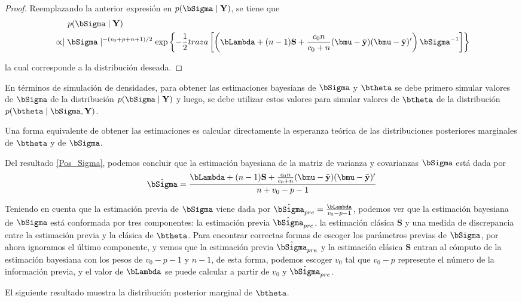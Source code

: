 \begin{proof}
Reemplazando la anterior expresión en $p(\bSigma\mid\mathbf{Y})$, se tiene que
\begin{align*}
&\ \ \ \ \ p(\bSigma\mid\mathbf{Y})\\
&\propto \mid\bSigma\mid^{-(v_0+p+n+1)/2}\exp\left\{-\frac{1}{2}traza\left[\left(\bLambda+(n-1)\mathbf{S}+\frac{c_0n}{c_0+n}(\bmu-\bar{\mathbf{y}})(\bmu-\bar{\mathbf{y}})'\right)\bSigma^{-1}\right]\right\}
\end{align*}

la cual corresponde a la distribución deseada.
\end{proof}

En términos de simulación de densidades, para obtener las estimaciones bayesians de $\bSigma$ y $\btheta$ se debe primero simular valores de $\bSigma$ de la distribución $p(\bSigma \mid \mathbf{Y})$ y luego, se debe utilizar estos valores para simular valores de $\btheta$ de la distribución $p(\btheta \mid \bSigma,\mathbf{Y})$.

Una forma equivalente de obtener las estimaciones es calcular directamente la esperanza teórica de las distribuciones posteriores marginales de $\btheta$ y de $\bSigma$. 

Del resultado \ref{Pos_Sigma}, podemos concluir que la estimación bayesiana de la matriz de varianza y covarianzas $\bSigma$ está dada por
\begin{equation*}
\hat{\bSigma}=\dfrac{\bLambda+(n-1)\mathbf{S}+\frac{c_0n}{c_0+n}(\bmu-\bar{\mathbf{y}})(\bmu-\bar{\mathbf{y}})'}{n+v_0-p-1}
\end{equation*}

Teniendo en cuenta que la estimación previa de $\bSigma$ viene dada por $\hat{\bSigma}_{pre}=\frac{\bLambda}{v_0-p-1}$, podemos ver que la estimación bayesiana de $\bSigma$ está conformada por tres componentes: la estimación previa $\hat{\bSigma}_{pre}$, la estimación clásica $\mathbf{S}$ y una medida de discrepancia entre la estimación previa y la clásica de $\btheta$. Para encontrar correctas formas de escoger los parámetros previas de $\bSigma$, por ahora ignoramos el último componente, y vemos que la estimación previa $\hat{\bSigma}_{pre}$ y la estimación clásica $\mathbf{S}$ entran al cómputo de la estimación bayesiana con los pesos de $v_0-p-1$ y $n-1$, de esta forma, podemos escoger $v_0$ tal que $v_0-p$ represente el número de la información previa, y el valor de $\bLambda$ se puede calcular a partir de $v_0$ y $\hat{\bSigma}_{pre}$. 

El siguiente resultado muestra la distribución posterior marginal de $\btheta$. 
                              
